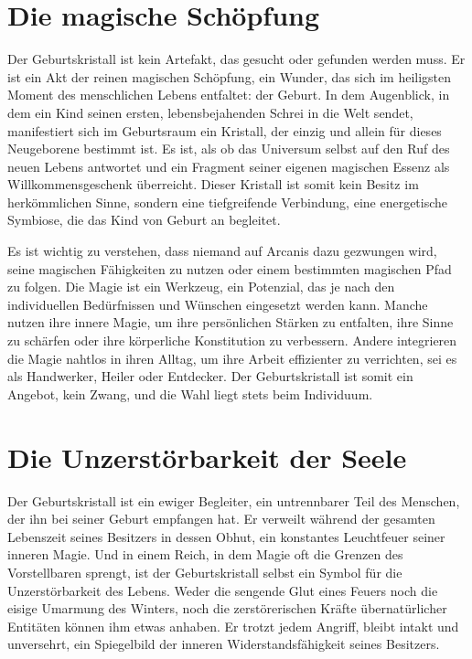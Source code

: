\documentclass[10pt,a4paper,twocolumn,openany]{book}
\begin{document}
\section{Die magische Schöpfung}

Der Geburtskristall ist kein Artefakt, das gesucht oder gefunden werden muss. Er ist ein Akt der reinen magischen Schöpfung, ein Wunder, das sich im heiligsten Moment des menschlichen Lebens entfaltet: der Geburt. In dem Augenblick, in dem ein Kind seinen ersten, lebensbejahenden Schrei in die Welt sendet, manifestiert sich im Geburtsraum ein Kristall, der einzig und allein für dieses Neugeborene bestimmt ist. Es ist, als ob das Universum selbst auf den Ruf des neuen Lebens antwortet und ein Fragment seiner eigenen magischen Essenz als Willkommensgeschenk überreicht. Dieser Kristall ist somit kein Besitz im herkömmlichen Sinne, sondern eine tiefgreifende Verbindung, eine energetische Symbiose, die das Kind von Geburt an begleitet.

Es ist wichtig zu verstehen, dass niemand auf Arcanis dazu gezwungen wird, seine magischen Fähigkeiten zu nutzen oder einem bestimmten magischen Pfad zu folgen. Die Magie ist ein Werkzeug, ein Potenzial, das je nach den individuellen Bedürfnissen und Wünschen eingesetzt werden kann. Manche nutzen ihre innere Magie, um ihre persönlichen Stärken zu entfalten, ihre Sinne zu schärfen oder ihre körperliche Konstitution zu verbessern. Andere integrieren die Magie nahtlos in ihren Alltag, um ihre Arbeit effizienter zu verrichten, sei es als Handwerker, Heiler oder Entdecker. Der Geburtskristall ist somit ein Angebot, kein Zwang, und die Wahl liegt stets beim Individuum.

\section{Die Unzerstörbarkeit der Seele}

Der Geburtskristall ist ein ewiger Begleiter, ein untrennbarer Teil des Menschen, der ihn bei seiner Geburt empfangen hat. Er verweilt während der gesamten Lebenszeit seines Besitzers in dessen Obhut, ein konstantes Leuchtfeuer seiner inneren Magie. Und in einem Reich, in dem Magie oft die Grenzen des Vorstellbaren sprengt, ist der Geburtskristall selbst ein Symbol für die Unzerstörbarkeit des Lebens. Weder die sengende Glut eines Feuers noch die eisige Umarmung des Winters, noch die zerstörerischen Kräfte übernatürlicher Entitäten können ihm etwas anhaben. Er trotzt jedem Angriff, bleibt intakt und unversehrt, ein Spiegelbild der inneren Widerstandsfähigkeit seines Besitzers.
\end{document}
